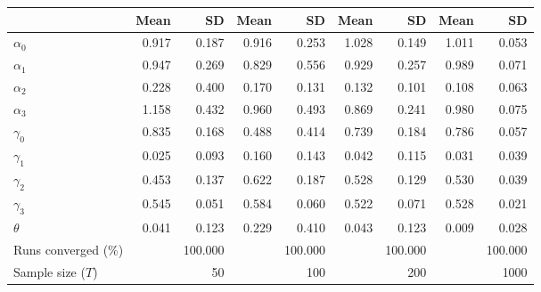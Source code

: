 
\begin{tabular}[t]{lrrrrrrrr}
\toprule
  & Mean & SD & Mean  & SD  & Mean   & SD   & Mean    & SD   \\
\midrule
$\alpha_{0}$ & 0.917 & 0.187 & 0.916 & 0.253 & 1.028 & 0.149 & 1.011 & 0.053\\
$\alpha_{1}$ & 0.947 & 0.269 & 0.829 & 0.556 & 0.929 & 0.257 & 0.989 & 0.071\\
$\alpha_{2}$ & 0.228 & 0.400 & 0.170 & 0.131 & 0.132 & 0.101 & 0.108 & 0.063\\
$\alpha_{3}$ & 1.158 & 0.432 & 0.960 & 0.493 & 0.869 & 0.241 & 0.980 & 0.075\\
$\gamma_{0}$ & 0.835 & 0.168 & 0.488 & 0.414 & 0.739 & 0.184 & 0.786 & 0.057\\
$\gamma_{1}$ & 0.025 & 0.093 & 0.160 & 0.143 & 0.042 & 0.115 & 0.031 & 0.039\\
$\gamma_{2}$ & 0.453 & 0.137 & 0.622 & 0.187 & 0.528 & 0.129 & 0.530 & 0.039\\
$\gamma_{3}$ & 0.545 & 0.051 & 0.584 & 0.060 & 0.522 & 0.071 & 0.528 & 0.021\\
$\theta$ & 0.041 & 0.123 & 0.229 & 0.410 & 0.043 & 0.123 & 0.009 & 0.028\\
Runs converged (\%) &  & 100.000 &  & 100.000 &  & 100.000 &  & 100.000\\
Sample size ($T$) &  & 50 &  & 100 &  & 200 &  & 1000\\
\bottomrule
\end{tabular}
